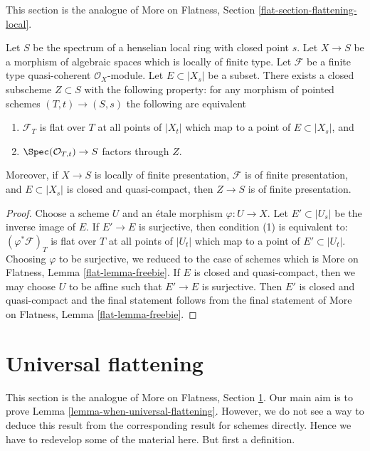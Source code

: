 \noindent
This section is the analogue of More on Flatness, Section
\ref{flat-section-flattening-local}.

\begin{lemma}
\label{lemma-freebie}
Let $S$ be the spectrum of a henselian local ring with closed point $s$.
Let $X \to S$ be a morphism of algebraic spaces which is
locally of finite type.
Let $\mathcal{F}$ be a finite type quasi-coherent $\mathcal{O}_X$-module.
Let $E \subset |X_s|$ be a subset. There exists a closed subscheme
$Z \subset S$ with the following property: for any morphism of pointed
schemes $(T, t) \to (S, s)$ the following are equivalent
\begin{enumerate}
\item $\mathcal{F}_T$ is flat over $T$ at all points of
$|X_t|$ which map to a point of $E \subset |X_s|$, and
\item $\Spec(\mathcal{O}_{T, t}) \to S$ factors through $Z$.
\end{enumerate}
Moreover, if $X \to S$ is locally of finite presentation,
$\mathcal{F}$ is of finite presentation, and $E \subset |X_s|$ is
closed and quasi-compact, then $Z \to S$ is of finite presentation.
\end{lemma}

\begin{proof}
Choose a scheme $U$ and an \'etale morphism $\varphi : U \to X$.
Let $E' \subset |U_s|$ be the inverse image of $E$. If
$E' \to E$ is surjective, then condition (1) is equivalent to:
$(\varphi^*\mathcal{F})_T$ is flat over $T$ at all points of
$|U_t|$ which map to a point of $E' \subset |U_t|$.
Choosing $\varphi$ to be surjective, we reduced to the case of schemes which is
More on Flatness, Lemma \ref{flat-lemma-freebie}.
If $E$ is closed and quasi-compact, then we may choose $U$ to be
affine such that $E' \to E$ is surjective. Then $E'$ is closed
and quasi-compact and the final statement follows from the
final statement of
More on Flatness, Lemma \ref{flat-lemma-freebie}.
\end{proof}









\section{Universal flattening}
\label{section-flattening-final}

\noindent
This section is the analogue of
More on Flatness, Section \ref{section-flattening-final}.
Our main aim is to prove
Lemma \ref{lemma-when-universal-flattening}.
However, we do not see a way to deduce this result
from the corresponding result for schemes directly.
Hence we have to redevelop some of the material here.
But first a definition.

